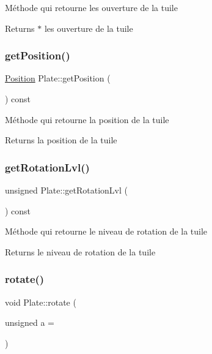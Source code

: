 Méthode qui retourne les ouverture de la tuile \begin{DoxyReturn}{Returns}
$\ast$ les ouverture de la tuile 
\end{DoxyReturn}
\mbox{\label{class_plate_aecd71bf092f486179d02605fa2c7771e}} 
\subsubsection{\texorpdfstring{getPosition()}{getPosition()}}
{\footnotesize\ttfamily \mbox{\hyperlink{class_position}{Position}} Plate\+::get\+Position (\begin{DoxyParamCaption}{ }\end{DoxyParamCaption}) const\hspace{0.3cm}{\ttfamily [inline]}}

Méthode qui retourne la position de la tuile \begin{DoxyReturn}{Returns}
la position de la tuile 
\end{DoxyReturn}
\mbox{\label{class_plate_af9021c86bc00272cc47686924f832055}} 
\subsubsection{\texorpdfstring{getRotationLvl()}{getRotationLvl()}}
{\footnotesize\ttfamily unsigned Plate\+::get\+Rotation\+Lvl (\begin{DoxyParamCaption}{ }\end{DoxyParamCaption}) const\hspace{0.3cm}{\ttfamily [inline]}}

Méthode qui retourne le niveau de rotation de la tuile \begin{DoxyReturn}{Returns}
le niveau de rotation de la tuile 
\end{DoxyReturn}
\mbox{\label{class_plate_ae1b0689ce319dcc4fc2e9466f898947f}} 
\subsubsection{\texorpdfstring{rotate()}{rotate()}}
{\footnotesize\ttfamily void Plate\+::rotate (\begin{DoxyParamCaption}\item[{unsigned}]{a = {} }\end{DoxyParamCaption})}

